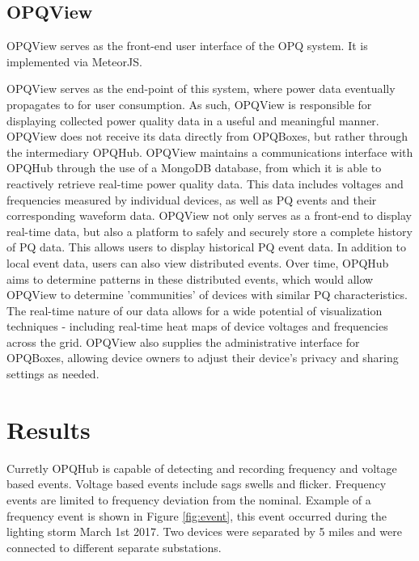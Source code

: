 \documentclass[a4paper, conference]{IEEEtran}
\begin{document}
\subsection{OPQView}
OPQView serves as the front-end user interface of the OPQ system. It is implemented via MeteorJS.

OPQView serves as the end-point of this system, where power data eventually propagates to for user consumption. As such, OPQView is responsible for displaying collected power quality data in a useful and meaningful manner. OPQView does not receive its data directly from OPQBoxes, but rather through the intermediary OPQHub.  OPQView maintains a communications interface with OPQHub through the use of a MongoDB database, from which it is able to reactively retrieve real-time power quality data. This data includes voltages and frequencies measured by individual devices, as well as PQ events and their corresponding waveform data. OPQView not only serves as a front-end to display real-time data, but also a platform to safely and securely store a complete history of PQ data. This allows users to display historical PQ event data. In addition to local event data, users can also view distributed events. Over time, OPQHub aims to determine patterns in these distributed events, which would allow OPQView to determine 'communities' of devices with similar PQ characteristics. The real-time nature of our data allows for a wide potential of visualization techniques - including real-time heat maps of device voltages and frequencies across the grid. OPQView also supplies the administrative interface for OPQBoxes, allowing device owners to adjust their device's privacy and sharing settings as needed. 

\section{Results}

Curretly OPQHub is capable of detecting and recording frequency and 
voltage based events. Voltage based events include sags swells and flicker.
Frequency events are limited to frequency deviation from the nominal. Example of a frequency event is shown in Figure \ref{fig:event}, this event occurred during the lighting storm March 1st 2017. Two devices were separated by 5 miles and were connected to different separate substations.
\end{document}
